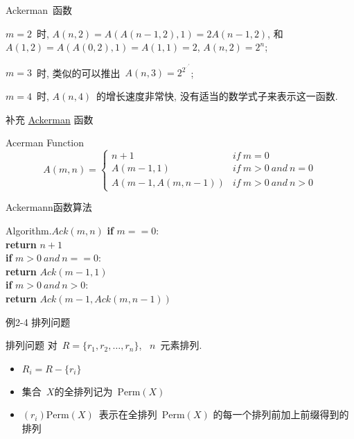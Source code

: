 \documentclass[fontset=fandol,UTF8,fleqn]{beamer}
\begin{document}
\begin{frame}{Ackerman~函数}
  \begin{exampleblock}{}
$m=2$~时,  $A(n, 2)=A(A(n-1, 2), 1)=2A(n-1, 2)$,  和~$A(1, 2)=A(A(0, 2), 1)=A(1, 1)=2$,  $A(n, 2)= 2^n$; 

$m=3$~时,  类似的可以推出~$A(n, 3)=2^{2^{\cdot^{\cdot^{\cdot^2}}}} $; 

$m=4$~时,  $A(n, 4)$~的增长速度非常快, 没有适当的数学式子来表示这一函数.  
\end{exampleblock}
\end{frame}

\begin{frame}{补充 \underline{Ackerman} 函数}
  \begin{exampleblock}{Acerman Function}
    \begin{displaymath}
A(m, n)=\left \{ \begin{array}{ll}
n + 1 & if\ m = 0 \\
A(m-1, 1) & if\ m > 0\ and\ n = 0 \\
A(m-1, A(m, n-1)) & if\ m > 0\ and\ n > 0
\end{array}\right.
\end{displaymath}
\end{exampleblock}
\end{frame}

\begin{frame}{Ackermann函数算法}
  \begin{exampleblock}{Algorithm.$Ack(m, n)$}
\qquad \textbf{if} $m == 0$:\\
\qquad \qquad     \textbf{return} $n + 1$\\
\qquad \textbf{if} $m > 0\ and\ n == 0$:\\
\qquad \qquad     \textbf{return} $Ack(m-1, 1)$\\
\qquad \textbf{if} $m > 0\ and\ n > 0$:\\
\qquad \qquad     \textbf{return} $Ack(m-1, Ack(m, n-1))$
\end{exampleblock}
\end{frame}

\begin{frame}{例2-4 排列问题}
  \begin{exampleblock}{排列问题}
    对~$R=\{r_1, r_2, \ldots,r_n\}$, ~$n$~元素排列. 
  \end{exampleblock}
  \begin{itemize}[<+-|alert@+>]
\item $R_i=R-\{r_i\}$  
\item 集合~$X$的全排列记为~$\mathrm{Perm}(X)$　 
\item $(r_i)\mathrm{Perm}(X)$~表示在全排列~$\mathrm{Perm}(X)$ 
的每一个排列前加上前缀得到的排列   
\end{itemize}
\end{frame}
\end{document}
